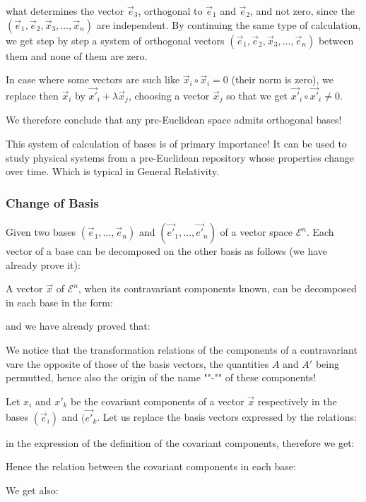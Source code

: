 	what determines the vector $\vec{e}_3$, orthogonal to $\vec{e}_1$ and $\vec{e}_2$, and not zero, since the $(\vec{e}_1,\vec{e}_2,\vec{x}_3,\ldots,\vec{x}_n)$ are independent. By continuing the same type of calculation, we get step by step a system of orthogonal vectors $(\vec{e}_1,\vec{e}_2,\vec{x}_3,\ldots,\vec{e}_n)$ between them and none of them are zero.
	
	In case where some vectors are such like $\vec{x}_i\circ\vec{x}_i=0$ (their norm is zero), we replace then $\vec{x}_i$ by $\vec{x'}_i+\lambda\vec{x}_j$, choosing a vector $\vec{x}_j$ so that we get $\vec{x'}_i\circ\vec{x'}_i\neq 0$.
	
	We therefore conclude that any pre-Euclidean space admits orthogonal bases!

	This system of calculation of bases is of primary importance! It can be used to study physical systems from a pre-Euclidean repository whose properties change over time. Which is typical in General Relativity.

	\subsubsection{Change of Basis}\label{change of basis tensor calculus}
	Given two bases $(\vec{e}_1,\ldots,\vec{e}_n)$ and $(\vec{e'}_1,\ldots,\vec{e'}_n)$ of a vector space $\mathcal{E}^n$. Each vector of a base can be decomposed on the other basis as follows (we have already prove it):
	
	A vector $\vec{x}$ of $\mathcal{E}^n$, when its contravariant components known, can be decomposed in each base in the form:
	
	and we have already proved that:
	
	We notice that the transformation relations of the components of a contravariant vare the opposite of those of the basis vectors, the quantities $A$ and $A '$ being permutted, hence also the origin of the name ""-"" of these components!

	Let $x_i$ and ${x'}_k$ be the covariant components of a vector $\vec{x}$ respectively in the bases $(\vec{e}_i)$ and $(\vec{e'}_k$. Let us replace the basis vectors expressed by the relations:
	
	in the expression of the definition of the covariant components, therefore we get:
	
	Hence the relation between the covariant components in each base:
	
	We get also:
	
